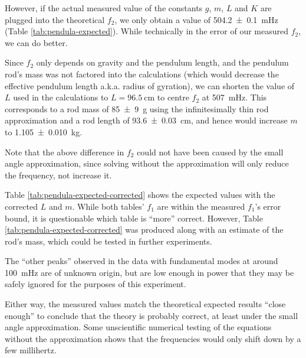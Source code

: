 \documentclass[a4paper]{scrartcl}
\begin{document}
However, if the actual measured value of the constants \(g\), \(m\), \(L\) and \(K\) are plugged into the theoretical \(f_2\), we only obtain a value of \SI{504.2 \pm 0.1}{\milli\hertz} (Table \ref{tab:pendula-expected}). While technically in the error of our measured \(f_2\), we can do better.

Since \(f_2\) only depends on gravity and the pendulum length, and the pendulum rod's mass was not factored into the calculations (which would decrease the effective pendulum length a.k.a. radius of gyration), we can shorten the value of \(L\) used in the calculations to \(L = \SI{96.5}{\centi\metre}\) to centre \(f_2\) at \SI{507}{\milli\hertz}. This corresponds to a rod mass of \SI{85 \pm 9}{\gram} using the infinitesimally thin rod approximation and a rod length of \SI{93.6 \pm 0.03}{\centi\metre}, and hence would increase \(m\) to \SI{1.105 \pm 0.010}{\kilo\gram}.

Note that the above difference in \(f_2\) could not have been caused by the small angle approximation, since solving without the approximation will only reduce the frequency, not increase it.

Table \ref{tab:pendula-expected-corrected} shows the expected values with the corrected \(L\) and \(m\). While both tables' \(f_1\) are within the measured \(f_1\)'s error bound, it is questionable which table is ``more'' correct. However, Table \ref{tab:pendula-expected-corrected} was produced along with an estimate of the rod's mass, which could be tested in further experiments.

The ``other peaks'' observed in the data with fundamental modes at around \SI{100}{\milli\hertz} are of unknown origin, but are low enough in power that they may be safely ignored for the purposes of this experiment.

Either way, the measured values match the theoretical expected results ``close enough'' to conclude that the theory is probably correct, at least under the small angle approximation. Some unscientific numerical testing of the equations without the approximation shows that the frequencies would only shift down by a few millihertz.

\printbibliography
\end{document}
